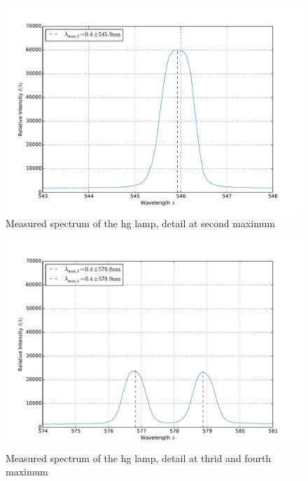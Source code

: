 \begin{figure}
\centering
\includegraphics[width=\pltw]{analysis/figures/hg2_max.pdf}
\caption{Measured spectrum of the hg lamp, detail at second maximum}
\label{fig:hg2_max}
\end{figure}

\begin{figure}
\centering
\includegraphics[width=\pltw]{analysis/figures/hg3_max.pdf}
\caption{Measured spectrum of the hg lamp, detail at thrid and fourth maximum}
\label{fig:hg3_max}
\end{figure}

